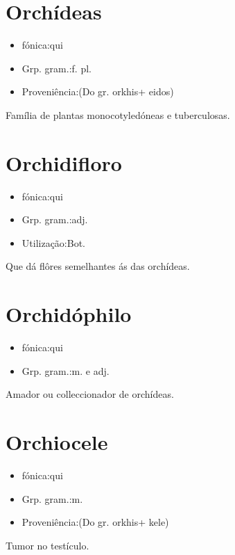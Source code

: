 \section{Orchídeas}
\begin{itemize}
\item {fónica:qui}
\end{itemize}
\begin{itemize}
\item {Grp. gram.:f. pl.}
\end{itemize}
\begin{itemize}
\item {Proveniência:(Do gr. \textunderscore orkhis\textunderscore  + \textunderscore eidos\textunderscore )}
\end{itemize}
Família de plantas monocotyledóneas e tuberculosas.
\section{Orchidifloro}
\begin{itemize}
\item {fónica:qui}
\end{itemize}
\begin{itemize}
\item {Grp. gram.:adj.}
\end{itemize}
\begin{itemize}
\item {Utilização:Bot.}
\end{itemize}
Que dá flôres semelhantes ás das orchídeas.
\section{Orchidóphilo}
\begin{itemize}
\item {fónica:qui}
\end{itemize}
\begin{itemize}
\item {Grp. gram.:m.  e  adj.}
\end{itemize}
Amador ou colleccionador de orchídeas.
\section{Orchiocele}
\begin{itemize}
\item {fónica:qui}
\end{itemize}
\begin{itemize}
\item {Grp. gram.:m.}
\end{itemize}
\begin{itemize}
\item {Proveniência:(Do gr. \textunderscore orkhis\textunderscore  + \textunderscore kele\textunderscore )}
\end{itemize}
Tumor no testículo.
